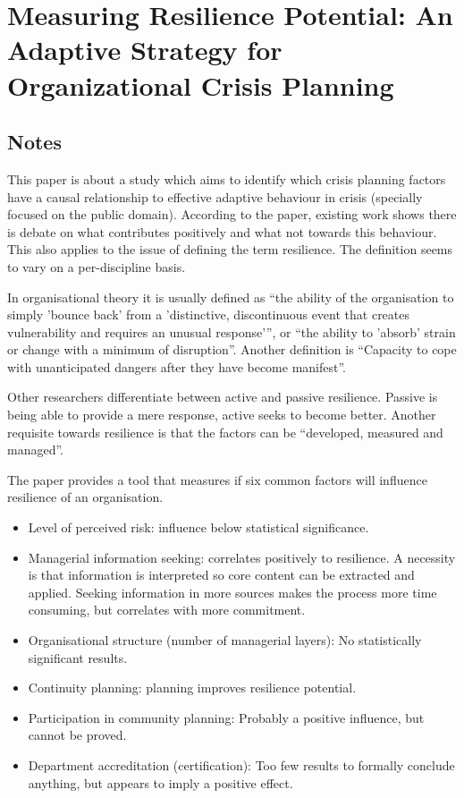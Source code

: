 \chapter{Measuring Resilience Potential: An Adaptive Strategy for Organizational Crisis Planning \cite{somers2009measuring}}
\section{Notes}
This paper is about a study which aims to identify which crisis planning factors have a causal relationship to effective adaptive behaviour in crisis (specially focused on the public domain).
According to the paper, existing work shows there is debate on what contributes positively and what not towards this behaviour.
This also applies to the issue of defining the term resilience. 
The definition seems to vary on a per-discipline basis.

In organisational theory it is usually defined as ``the ability of the organisation to simply 'bounce back' from a 'distinctive, discontinuous event that creates vulnerability and requires an unusual response'{''}, or ``the ability to 'absorb' strain or change with a minimum of disruption''.
Another definition is ``Capacity to cope with unanticipated dangers after they have become manifest''.

Other researchers differentiate between active and passive resilience. 
Passive is being able to provide a mere response, active seeks to become better.
Another requisite towards resilience is that the factors can be ``developed, measured and managed''. 

The paper provides a tool that measures if six common factors will influence resilience of an organisation. 
\begin{itemize}
\item Level of perceived risk: influence below statistical significance.
\item Managerial information seeking: correlates positively to resilience. A necessity is that information is interpreted so core content can be extracted and applied. Seeking information in more sources makes the process more time consuming, but correlates with more commitment.
\item Organisational structure (number of managerial layers): No statistically significant results. 
\item Continuity planning: planning improves resilience potential.
\item Participation in community planning: Probably a positive influence, but cannot be proved.
\item Department accreditation (certification): Too few results to formally conclude anything, but appears to imply a positive effect.
\end{itemize}

